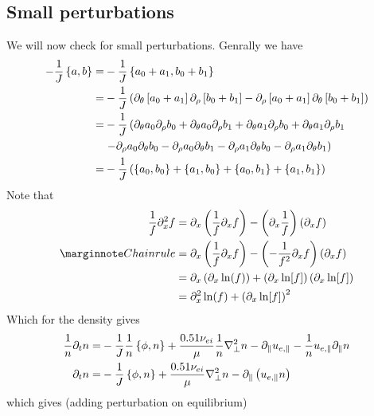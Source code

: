 \subsection{Small perturbations}
We will now check for small perturbations.
Genrally we have
\begin{align*}
    -\frac{1}{J}\left\{a,b\right\}
 =&
 -\frac{1}{J}\left\{a_0+a_1,b_0+b_1\right\}
\\
 =&
 -\frac{1}{J} \left( \partial_\theta \left[ a_0 + a_1 \right]
                  \partial_\rho   \left[ b_0 + b_1 \right]
                - \partial_\rho   \left[ a_0 + a_1 \right]
                  \partial_\theta \left[ b_0 +b_1 \right]
                \right)
\\
 =&
 -\frac{1}{J} \left(
   \partial_\theta a_0 \partial_\rho b_0
 + \partial_\theta a_0 \partial_\rho b_1
 + \partial_\theta a_1 \partial_\rho b_0
 + \partial_\theta a_1 \partial_\rho b_1
 \right.
 \\&
 \left.
 - \partial_\rho a_0 \partial_\theta b_0
 - \partial_\rho a_0 \partial_\theta b_1
 - \partial_\rho a_1 \partial_\theta b_0
 - \partial_\rho a_1 \partial_\theta b_1
                \right)
\\
 =&
 -\frac{1}{J} \left(
   \left\{a_0,b_0\right\}
 + \left\{a_1,b_0\right\}
 + \left\{a_0,b_1\right\}
 + \left\{a_1,b_1\right\}
                \right)
\end{align*}
Note that
\begin{align*}
    \frac{1}{f}\partial_x^2 f
    &=
    \partial_x\L(\frac{1}{f}\partial_x f\R)
    - \L(\partial_x\frac{1}{f}\R)\L(\partial_x f\R)
    \\
    \note{Chain rule}
    &=
    \partial_x\L(\frac{1}{f}\partial_x f\R)
    - \L(-\frac{1}{f^2}\partial_x f\R)\L(\partial_x f\R)
    \\
    &=
    \partial_x\L(\partial_x \ln(f)\R)
    + \L(\partial_x \ln[f]\R)\L(\partial_x \ln[f]\R)
    \\
    &=
    \partial_x^2 \ln(f)
    + \L(\partial_x \ln[f]\R)^2
\end{align*}
Which for the density gives
\begin{align*}
 \frac{1}{n}\partial_t n
 =&
 -\frac{1}{J}\frac{1}{n}\L\{\phi,n\R\}
 +\frac{0.51\nu_{ei}}{\mu} \frac{1}{n}\grad_\perp^2 n
- \partial_\|u_{e,\|}
- \frac{1}{n}u_{e,\|} \partial_\| n
\\
%
 \partial_t n
 =&
 -\frac{1}{J}\L\{\phi,n\R\}
 +\frac{0.51\nu_{ei}}{\mu} \grad_\perp^2 n
-  \partial_\| \L(u_{e,\|}n\R)
\end{align*}
which gives (adding perturbation on equilibrium)
